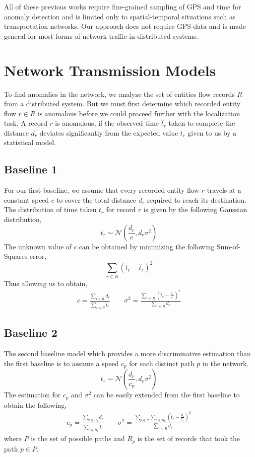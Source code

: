 \documentclass[conference]{IEEEtran.1.8}
\begin{document}
All of these previous works \cite{Chawla2012, Ge2011, Liu2011, Pan2013, Zhang2011, Zhang2012} require fine-grained sampling of GPS and time for anomaly detection and is limited only to spatial-temporal situations such as transportation networks. Our approach does not require GPS data and is made general for most forms of network traffic in distributed systems.

\section{Network Transmission Models}
\label{sec:models}

To find anomalies in the network, we analyze the set of entities flow records $R$ from a distributed system. But we must first determine which recorded entity flow $r \in R$ is anomalous before we could proceed further with the localization task. A record $r$ is anomalous, if the observed time $\hat{t}_r$ taken to complete the distance $d_r$ deviates significantly from the expected value $t_r$ given to us by a statistical model.

\subsection{Baseline 1}

For our first baseline, we assume that every recorded entity flow $r$ travels at a constant speed $c$ to cover the total distance $d_r$ required to reach its destination. The distribution of time taken $t_r$ for record $r$ is given by the following Gaussian distribution,
\[ t_r \sim \mathcal{N} \left( \frac{d_r}{c}, d_r \sigma^2 \right) \]
The unknown value of $c$ can be obtained by minimizing the following Sum-of-Squares error,
\[ \sum_{r \in R} (t_r - \hat{t}_r)^2 \]
Thus allowing us to obtain,
\begin{gather*}
	c = \frac{\sum_{r \in R} d_r}{\sum_{r \in R} \hat{t}_r} \qquad
    \sigma^2 = \frac{ \sum_{r \in R} \left( \hat{t}_r - \frac{d_r}{c} \right)^2 }{ \sum_{r \in R} d_r }
\end{gather*}

\subsection{Baseline 2}

The second baseline model which provides a more discriminative estimation than the first baseline is to assume a speed $c_p$ for each distinct path $p$ in the network.
\[ t_r \sim \mathcal{N} \left( \frac{d_r}{c_p}, d_r \sigma^2 \right) \]
The estimation for $c_p$ and $\sigma^2$ can be easily extended from the first baseline to obtain the following,
\begin{gather*}
	c_p = \frac{\sum_{r \in R_p} d_r}{\sum_{r \in R_p} \hat{t}_r} \qquad
    \sigma^2 = \frac{ \sum_{p \in P} \sum_{r \in R_p} \left( \hat{t}_r - \frac{d_r}{c_p} \right)^2 }{ \sum_{r \in R} d_r }
\end{gather*}
where $P$ is the set of possible paths and $R_p$ is the set of records that took the path $p \in P$.
\end{document}
